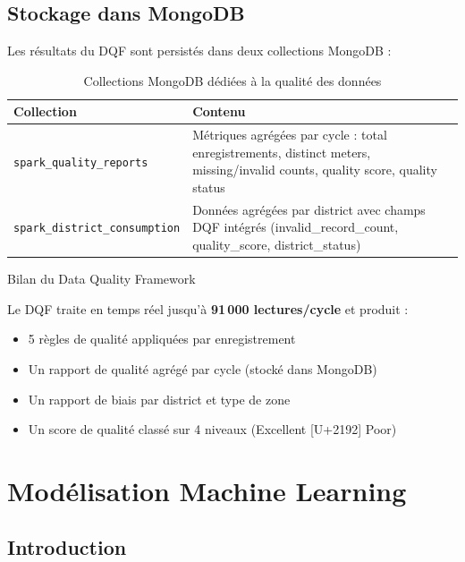 \documentclass[1pt,a4paper]{report}
\begin{document}
\section{Stockage dans MongoDB}

Les r\'{e}sultats du DQF sont persist\'{e}s dans deux collections MongoDB :

\begin{table}[H]
\centering
\caption{Collections MongoDB d\'{e}di\'{e}es \`{a} la qualit\'{e} des donn\'{e}es}
\label{tab:mongo_dqf}
\renewcommand{\arraystretch}{1.4}
\begin{tabularx}{\textwidth}{|l|X|}
\hline
\rowcolor{primaryblue!20}
\textbf{Collection} & \textbf{Contenu} \\
\hline
\texttt{spark\_quality\_reports} & M\'{e}triques agr\'{e}g\'{e}es par cycle : total enregistrements, distinct meters, missing/invalid counts, quality score, quality status \\
\texttt{spark\_district\_consumption} & Donn\'{e}es agr\'{e}g\'{e}es par district avec champs DQF int\'{e}gr\'{e}s (invalid\_record\_count, quality\_score, district\_status) \\
\hline
\end{tabularx}
\end{table}

\begin{resultbox}Bilan du Data Quality Framework

Le DQF traite en temps r\'{e}el jusqu'\`{a} \textbf{91\,000 lectures/cycle} et produit :
\begin{itemize}[noitemsep]
  \item 5 r\`{e}gles de qualit\'{e} appliqu\'{e}es par enregistrement
  \item Un rapport de qualit\'{e} agr\'{e}g\'{e} par cycle (stock\'{e} dans MongoDB)
  \item Un rapport de biais par district et type de zone
  \item Un score de qualit\'{e} class\'{e} sur 4 niveaux (Excellent [U+2192] Poor)
\end{itemize}
\end{resultbox}



\chapter{Mod\'{e}lisation Machine Learning}
\label{chap:ml}

\section{Introduction}
\end{document}
